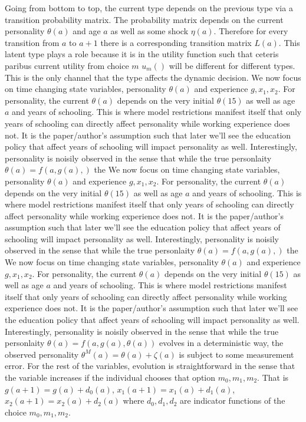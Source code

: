 \documentclass[12pt]{article}
\begin{document}
Going from bottom to top, the current type depends on the previous type via a transition probability matrix. The probability matrix depends on the current personality $\theta(a)$ and age $a$ as well as some shock $\eta(a)$. Therefore for every transition from $a$ to $a+1$ there is a corresponding transition matrix $L(a)$. This latent type plays a role because it is in the utility function such that ceteris paribus current utility from choice $m$ $u_m()$ will be different for different types. This is the only channel that the type affects the dynamic decision. 
We now focus on time changing state variables, personality $\theta(a)$ and experience $g,x_1,x_2$. For personality, the current $\theta(a)$ depends on the very initial $\theta(15)$ as well as age $a$ and years of schooling. This is where model restrictions manifest itself that only years of schooling can directly affect personality while working experience does not. It is the paper/author's assumption such that later we'll see the education policy that affect years of schooling will impact personality as well. Interestingly, personality is noisily observed in the sense that while the true personlaity $\theta(a) = f(a,g(a),)$ the 
We now focus on time changing state variables, personality $\theta(a)$ and experience $g,x_1,x_2$. For personality, the current $\theta(a)$ depends on the very initial $\theta(15)$ as well as age $a$ and years of schooling. This is where model restrictions manifest itself that only years of schooling can directly affect personality while working experience does not. It is the paper/author's assumption such that later we'll see the education policy that affect years of schooling will impact personality as well. Interestingly, personality is noisily observed in the sense that while the true personlaity $\theta(a) = f(a,g(a),)$ the 
We now focus on time changing state variables, personality $\theta(a)$ and experience $g,x_1,x_2$. For personality, the current $\theta(a)$ depends on the very initial $\theta(15)$ as well as age $a$ and years of schooling. This is where model restrictions manifest itself that only years of schooling can directly affect personality while working experience does not. It is the paper/author's assumption such that later we'll see the education policy that affect years of schooling will impact personality as well. Interestingly, personality is noisily observed in the sense that while the true personlaity $\theta(a) = f(a,g(a),\theta(a))$ evolves in a deterministic way, the observed personality $\theta^M(a) = \theta(a) + \zeta(a)$ is subject to some measurement error. 
For the rest of the variables, evolution is straightforward in the sense that the variable increases if the individual chooses that option $m_0,m_1,m_2$. That is 
$g(a+1) = g(a) + d_0(a)$, $x_1(a+1) = x_1(a) + d_1(a)$, $x_2(a+1) = x_2(a) + d_2(a)$ where $d_0,d_1,d_2$ are indicator functions of the choice $m_0,m_1,m_2$.
\end{document}
